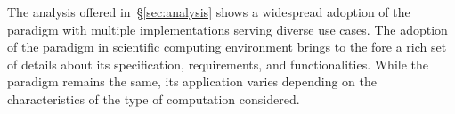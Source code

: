 \documentclass{sig-alternate}
\begin{document}

The analysis offered in~\S\ref{sec:analysis} shows a widespread adoption of the
\pilot paradigm with multiple implementations serving diverse use cases.  The
adoption of the \pilot paradigm in scientific computing environment brings to
the fore a rich set of details about its specification, requirements, and
functionalities.  While the paradigm remains the same, its application varies
depending on the characteristics of the type of computation considered.






\end{document}
